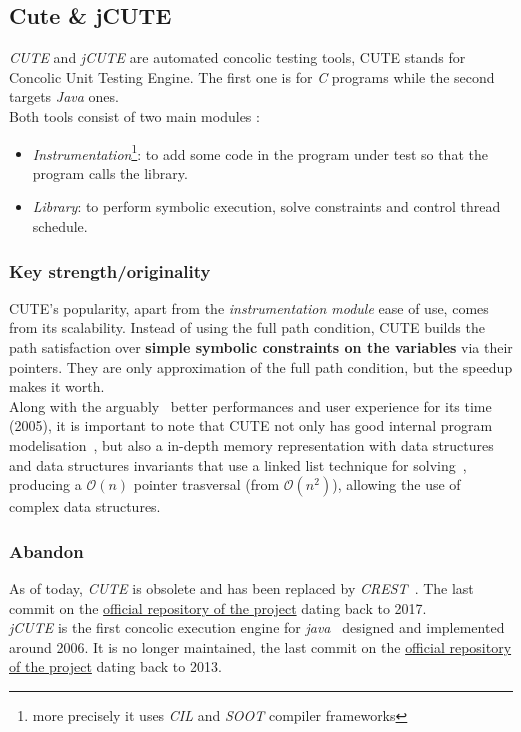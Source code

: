 \documentclass[11pt, conference]{IEEEtran}
\begin{document}

	\subsection{Cute \& jCUTE}
		\emph{CUTE} and \emph{jCUTE} are automated concolic testing tools, CUTE stands for Concolic Unit Testing Engine\cite{sen2006cute}. The first one is for \emph{C} programs while the second targets \emph{Java} ones.\\

		Both tools consist of two main modules :
		\begin{itemize}
			\item \emph{Instrumentation}\footnote{more precisely it uses \emph{CIL} and \emph{SOOT} compiler frameworks}: to add some code in the program under test so that the program calls the library.
			\item \emph{Library}: to perform symbolic execution, solve constraints and control thread schedule.
		\end{itemize}

    \subsubsection{Key strength/originality}
    CUTE's popularity, apart from the \emph{instrumentation module} ease of use, comes from its scalability. Instead of using the full path condition, CUTE builds the path satisfaction over \textbf{simple symbolic constraints on the variables} via their pointers. They are only approximation of the full path condition, but the speedup makes it worth.\\
    Along with the arguably~\cite{cuteforc} better performances and user experience for its time (2005), it is important to note that CUTE not only has good internal program modelisation~\cite{sen2006cute}, but also a in-depth memory representation with data structures and data structures invariants that use a linked list technique for solving~\cite{cuteforc}, producing a $\mathcal{O}(n)$ pointer trasversal (from $\mathcal{O}({n^2})$), allowing the use of complex data structures.

    \subsubsection{Abandon}
		As of today, \emph{CUTE} is obsolete and has been replaced by \emph{CREST}~\cite{CuteWebSite}. The last commit on the \href{https://github.com/jburnim/crest}{official repository of the project} dating back to 2017. \\
		\emph{jCUTE} is the first concolic execution engine for \emph{java}~\cite{jDart} designed and implemented around 2006. It is no longer maintained, the last commit on the \href{https://github.com/osl/jcute}{official repository of the project} dating back to 2013.
\end{document}
